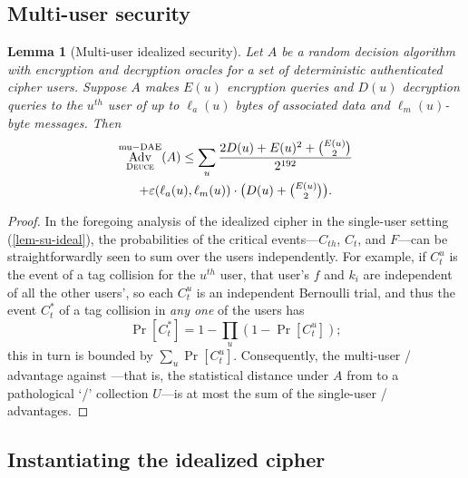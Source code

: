 \documentclass[draft]{article}
\newtheorem{lemma}{Lemma}
\DeclareRobustCommand{\operatorsc}[1]{{%
  \ifmmode\let\next=\operatorname\else\let\next=\relax\fi\next{\textsc{#1}}}}
\def\Deuce/{\operatorsc{Deuce}}
\DeclareMathOperator{\Adv}{Adv}
\DeclareMathOperator{\muDAE}{mu-DAE}
\newcommand{\collisionbound}{\varepsilon}
\begin{document}
\subsection{Multi-user security}

\begin{lemma}[Multi-user idealized security]\label{lem-mu-ideal}
  Let $A$ be a random decision algorithm with encryption and
   decryption oracles for a \emph{set} of deterministic authenticated
   cipher users.
  Suppose $A$ makes $E(u)$ encryption queries and $D(u)$ decryption
   queries to the $u^{\mathit{th}}$ user of up to $\ell_a(u)$ bytes of
   associated data and $\ell_m(u)$-byte messages.
  Then
%
  \begin{multline*}
    \Adv^{\muDAE}_{\Deuce/}(A)
    \leq \sum_u \frac{2 D(u) + E(u)^2 + \binom{E(u)}{2}}
                     {2^{192}} \\
           + \collisionbound(\ell_a(u), \ell_m(u))
             \cdot
             {\textstyle\bigl(D(u) + \binom{E(u)}{2}\bigr)}.
  \end{multline*}
\end{lemma}

\begin{proof}
  In the foregoing analysis of the idealized cipher \Deuce/ in the
   single-user setting (\autoref{lem-su-ideal}), the probabilities of
   the critical events---$C_{th}$, $C_t$, and $F$---can be
   straightforwardly seen to sum over the users independently.
  For example, if $C_t^u$ is the event of a tag collision for the
   $u^{\mathit{th}}$ user, that user's $f$ and $k_i$ are independent of
   all the other users', so each $C_t^u$ is an independent Bernoulli
   trial, and thus the event $C_t^*$ of a tag collision in
   \emph{any one} of the users has
  \[
    \Pr[C_t^*] = 1 - \prod_u (1 - \Pr[C_t^u]);
  \]
   this in turn is bounded by $\sum_u \Pr[C_t^u]$.
  Consequently, the multi-user \DAE/ advantage against \Deuce/---that
   is, the statistical distance under $A$ from \Deuce/ to a
   pathological `\DAE/' collection $U$---is at most the sum of the
   single-user \DAE/ advantages.
\end{proof}

\subsection{Instantiating the idealized cipher}
\end{document}
